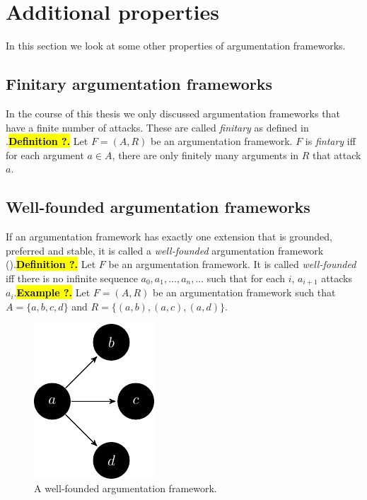 \section{Additional properties} %
In this section we look at some other properties of argumentation frameworks.\cl

\subsection{Finitary argumentation frameworks}
In the course of this thesis we only discussed argumentation frameworks that have a finite number of attacks. These are called \emph{finitary} as defined in \cite{Dung}.\hl

\textbf{Definition ?.} Let $F=(A,R)$ be an argumentation framework. $F$ is \emph{fintary} iff for each argument $a\in A$, there are only finitely many arguments in $R$ that attack $a$.\cl %

\subsection{Well-founded argumentation frameworks}
If an argumentation framework has exactly one extension that is grounded, preferred and stable, it is called a \emph{well-founded} argumentation framework (\cite{Dung}).\hl %

\textbf{Definition ?.} Let $F$ be an argumentation framework. It is called \emph{well-founded} iff there is no infinite sequence $a_0,a_1, ... , a_n, ...$ such that for each $i$, $a_{i+1}$ attacks $a_i$.\hl %

\textbf{Example ?.} Let $F=(A,R)$ be an argumentation framework such that $A=\{a,b,c,d\}$ and $R=\{(a,b),(a,c),(a,d)\}$.\hl

\FloatBarrier
\begin{figure}[!h]
	\centering
	\includegraphics[scale=1.5]{graphs/wfex.pdf}
	\caption{A well-founded argumentation framework.}
\end{figure}
\FloatBarrier

